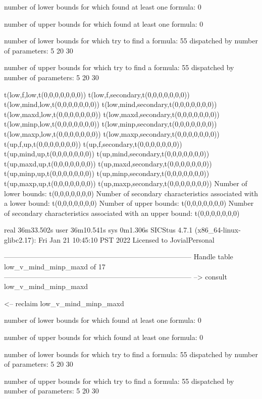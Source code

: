 number of lower bounds for which found at least one formula: 0

number of upper bounds for which found at least one formula: 0

number of lower bounds for which try to find a formula: 55
dispatched by number of parameters: 5  20  30

number of upper bounds for which try to find a formula: 55
dispatched by number of parameters: 5  20  30

t(low,f,low,t(0,0,0,0,0,0,0))
t(low,f,secondary,t(0,0,0,0,0,0,0))
t(low,mind,low,t(0,0,0,0,0,0,0))
t(low,mind,secondary,t(0,0,0,0,0,0,0))
t(low,maxd,low,t(0,0,0,0,0,0,0))
t(low,maxd,secondary,t(0,0,0,0,0,0,0))
t(low,minp,low,t(0,0,0,0,0,0,0))
t(low,minp,secondary,t(0,0,0,0,0,0,0))
t(low,maxp,low,t(0,0,0,0,0,0,0))
t(low,maxp,secondary,t(0,0,0,0,0,0,0))
t(up,f,up,t(0,0,0,0,0,0,0))
t(up,f,secondary,t(0,0,0,0,0,0,0))
t(up,mind,up,t(0,0,0,0,0,0,0))
t(up,mind,secondary,t(0,0,0,0,0,0,0))
t(up,maxd,up,t(0,0,0,0,0,0,0))
t(up,maxd,secondary,t(0,0,0,0,0,0,0))
t(up,minp,up,t(0,0,0,0,0,0,0))
t(up,minp,secondary,t(0,0,0,0,0,0,0))
t(up,maxp,up,t(0,0,0,0,0,0,0))
t(up,maxp,secondary,t(0,0,0,0,0,0,0))
Number of lower bounds:                                             t(0,0,0,0,0,0,0)
Number of secondary characteristics associated with a lower bound:  t(0,0,0,0,0,0,0)
Number of upper bounds:                                             t(0,0,0,0,0,0,0)
Number of secondary characteristics associated with an upper bound: t(0,0,0,0,0,0,0)

real	36m33.502s
user	36m10.541s
sys	0m1.306s
SICStus 4.7.1 (x86_64-linux-glibc2.17): Fri Jan 21 10:45:10 PST 2022
Licensed to JovialPersonal


--------------------------------------------------------------------------------
Handle table low_v_mind_minp_maxd of 17
--------------------------------------------------------------------------------
--> consult low_v_mind_minp_maxd

<-- reclaim low_v_mind_minp_maxd

number of lower bounds for which found at least one formula: 0

number of upper bounds for which found at least one formula: 0

number of lower bounds for which try to find a formula: 55
dispatched by number of parameters: 5  20  30

number of upper bounds for which try to find a formula: 55
dispatched by number of parameters: 5  20  30

